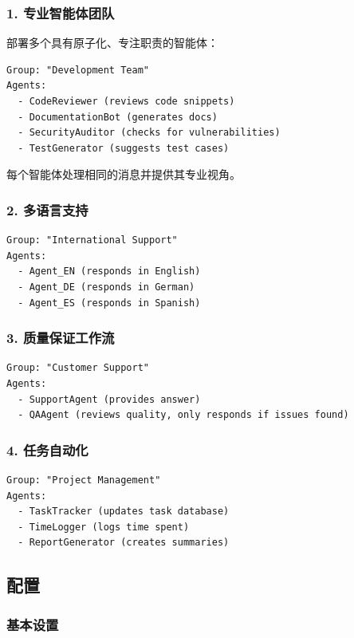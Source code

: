 \subsubsection{1. 专业智能体团队}


部署多个具有原子化、专注职责的智能体：

\begin{lstlisting}
Group: "Development Team"
Agents:
  - CodeReviewer (reviews code snippets)
  - DocumentationBot (generates docs)
  - SecurityAuditor (checks for vulnerabilities)
  - TestGenerator (suggests test cases)
\end{lstlisting}


每个智能体处理相同的消息并提供其专业视角。

\subsubsection{2. 多语言支持}


\begin{lstlisting}
Group: "International Support"
Agents:
  - Agent_EN (responds in English)
  - Agent_DE (responds in German)
  - Agent_ES (responds in Spanish)
\end{lstlisting}


\subsubsection{3. 质量保证工作流}


\begin{lstlisting}
Group: "Customer Support"
Agents:
  - SupportAgent (provides answer)
  - QAAgent (reviews quality, only responds if issues found)
\end{lstlisting}


\subsubsection{4. 任务自动化}


\begin{lstlisting}
Group: "Project Management"
Agents:
  - TaskTracker (updates task database)
  - TimeLogger (logs time spent)
  - ReportGenerator (creates summaries)
\end{lstlisting}


\subsection{配置}


\subsubsection{基本设置}


